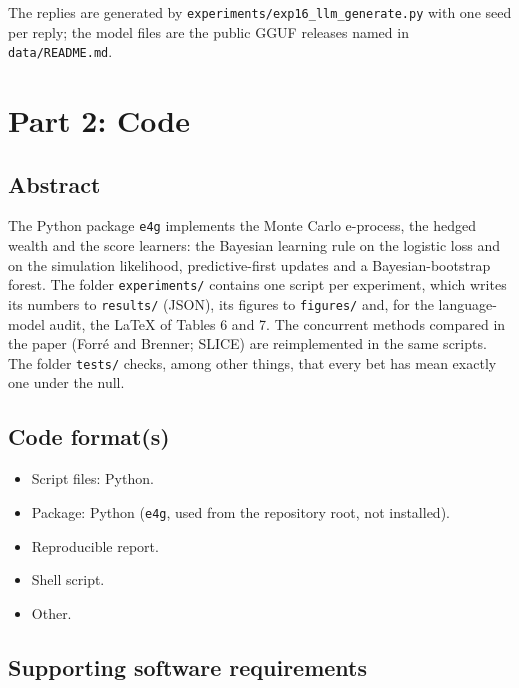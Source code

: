 \documentclass[11pt]{article}
\providecommand{\tightlist}{\setlength{\itemsep}{0pt}\setlength{\parskip}{0pt}}
\begin{document}
The replies are generated by
\texttt{experiments/exp16\_llm\_generate.py} with one seed per reply;
the model files are the public GGUF releases named in
\texttt{data/README.md}.

\hypertarget{part-2-code}{%
\section{Part 2: Code}\label{part-2-code}}

\hypertarget{abstract-1}{%
\subsection{Abstract}\label{abstract-1}}

The Python package \texttt{e4g} implements the Monte Carlo e-process,
the hedged wealth and the score learners: the Bayesian learning rule on
the logistic loss and on the simulation likelihood, predictive-first
updates and a Bayesian-bootstrap forest. The folder
\texttt{experiments/} contains one script per experiment, which writes
its numbers to \texttt{results/} (JSON), its figures to
\texttt{figures/} and, for the language-model audit, the LaTeX of Tables
6 and 7. The concurrent methods compared in the paper (Forré and
Brenner; SLICE) are reimplemented in the same scripts. The folder
\texttt{tests/} checks, among other things, that every bet has mean
exactly one under the null.

\hypertarget{code-formats}{%
\subsection{Code format(s)}\label{code-formats}}

\begin{itemize}
\tightlist
\item[$\boxtimes$]
  Script files: Python.
\item[$\boxtimes$]
  Package: Python (\texttt{e4g}, used from the repository root, not
  installed).
\item[$\square$]
  Reproducible report.
\item[$\square$]
  Shell script.
\item[$\square$]
  Other.
\end{itemize}

\hypertarget{supporting-software-requirements}{%
\subsection{Supporting software
requirements}\label{supporting-software-requirements}}
\end{document}
